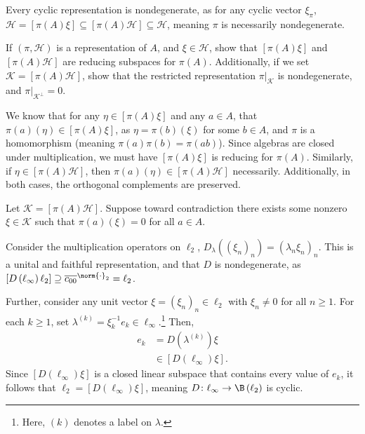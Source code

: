 \documentclass[10pt]{mypackage}
\begin{document}
Every cyclic representation is nondegenerate, as for any cyclic vector $\xi_{\pi}$, $\mathcal{H} = \left[\pi(A)\xi\right]\subseteq \left[\pi(A)\mathcal{H}\right]\subseteq \mathcal{H}$, meaning $\pi$ is necessarily nondegenerate.
\begin{exercise}
  If $\left(\pi,\mathcal{H}\right)$ is a representation of $A$, and $\xi\in \mathcal{H}$, show that $\left[\pi(A)\xi\right]$ and $\left[\pi(A)\mathcal{H}\right]$ are reducing subspaces for $\pi(A)$. Additionally, if we set $\mathcal{K} = \left[\pi(A)\mathcal{H}\right]$, show that the restricted representation $\pi|_{\mathcal{K}}$ is nondegenerate, and $\pi|_{\mathcal{K}^{\perp}} = 0$.
\end{exercise}
\begin{solution}
  We know that for any $\eta\in \left[\pi(A)\xi\right]$ and any $a\in A$, that $\pi(a)\left(\eta\right)\in \left[\pi(A)\xi\right]$, as $\eta = \pi(b)\left(\xi\right)$ for some $b\in A$, and $\pi$ is a homomorphism (meaning $\pi(a)\pi(b) = \pi(ab)$). Since algebras are closed under multiplication, we must have $\left[\pi(A)\xi\right]$ is reducing for $\pi(A)$. Similarly, if $\eta\in \left[\pi(A)\mathcal{H}\right]$, then $\pi(a)\left(\eta\right)\in \left[\pi(A)\mathcal{H}\right]$ necessarily. Additionally, in both cases, the orthogonal complements are preserved.\newline

  Let $\mathcal{K} = \left[\pi(A)\mathcal{H}\right]$. Suppose toward contradiction there exists some nonzero $\xi\in \mathcal{K}$ such that $\pi(a)\left(\xi\right) = 0$ for all $a\in A$. 
\end{solution}
\begin{example}
  Consider the multiplication operators on $\ell_2$, $D_{\lambda}\left(\left(\xi_n\right)_n\right) = \left(\lambda_n\xi_n\right)_n$. This is a unital and faithful representation, and that $D$ is nondegenerate, as $\left[D\left(\ell_{\infty}\right)\ell_2\right] \supseteq \overline{c_{00}}^{\norm{\cdot}_2} = \ell_2$.\newline

  Further, consider any unit vector $\xi = \left(\xi_n\right)_n\in \ell_2$ with $\xi_n \neq 0$ for all $n\geq 1$. For each $k\geq 1$, set $\lambda^{(k)} = \xi_k^{-1}e_k\in \ell_{\infty}$.\footnote{Here, $(k)$ denotes a label on $\lambda$.} Then,
  \begin{align*}
    e_k &= D\left(\lambda^{(k)}\right)\xi\\
        &\in \left[D\left(\ell_{\infty}\right)\xi\right].
  \end{align*}
  Since $\left[D\left(\ell_{\infty}\right)\xi\right]$ is a closed linear subspace that contains every value of $e_k$, it follows that $\ell_2 = \left[D\left(\ell_{\infty}\right)\xi\right]$, meaning $D\colon \ell_{\infty}\rightarrow \B\left(\ell_2\right)$ is cyclic.
\end{example}
\end{document}
